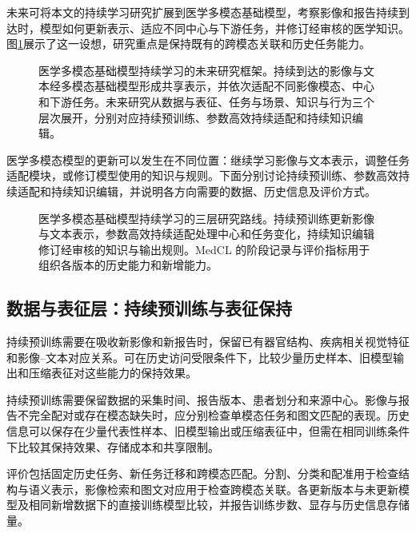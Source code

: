 未来可将本文的持续学习研究扩展到医学多模态基础模型，考察影像和报告持续到达时，模型如何更新表示、适应不同中心与下游任务，并修订经审核的医学知识。图\ref{fig:future-medical-mllm}展示了这一设想，研究重点是保持既有的跨模态关联和历史任务能力。

\begin{figure}[htbp]
\centering
\resizebox{\thesisfigurewidth}{!}{}
\caption[医学多模态基础模型持续学习的未来研究框架]{医学多模态基础模型持续学习的未来研究框架。持续到达的影像与文本经多模态基础模型形成共享表示，并依次适配不同影像模态、中心和下游任务。未来研究从数据与表征、任务与场景、知识与行为三个层次展开，分别对应持续预训练、参数高效持续适配和持续知识编辑。}
\label{fig:future-medical-mllm}
\end{figure}

医学多模态模型的更新可以发生在不同位置：继续学习影像与文本表示，调整任务适配模块，或修订模型使用的知识与规则。下面分别讨论持续预训练、参数高效持续适配和持续知识编辑，并说明各方向需要的数据、历史信息及评价方式。

\begin{figure}[htbp]
\centering
\resizebox{\thesisfigurewidth}{!}{}
\caption[医学多模态基础模型持续学习的三层研究路线]{医学多模态基础模型持续学习的三层研究路线。持续预训练更新影像与文本表示，参数高效持续适配处理中心和任务变化，持续知识编辑修订经审核的知识与输出规则。MedCL 的阶段记录与评价指标用于组织各版本的历史能力和新增能力。}
\label{fig:future-three-level-roadmap}
\end{figure}

\subsection{数据与表征层：持续预训练与表征保持}

持续预训练需要在吸收新影像和新报告时，保留已有器官结构、疾病相关视觉特征和影像--文本对应关系。可在历史访问受限条件下，比较少量历史样本、旧模型输出和压缩表征对这些能力的保持效果。

持续预训练需要保留数据的采集时间、报告版本、患者划分和来源中心。影像与报告不完全配对或存在模态缺失时，应分别检查单模态任务和图文匹配的表现。历史信息可以保存在少量代表性样本、旧模型输出或压缩表征中，但需在相同训练条件下比较其保持效果、存储成本和共享限制。

评价包括固定历史任务、新任务迁移和跨模态匹配。分割、分类和配准用于检查结构与语义表示，影像检索和图文对应用于检查跨模态关联。各更新版本与未更新模型及相同新增数据下的直接训练模型比较，并报告训练步数、显存与历史信息存储量。


